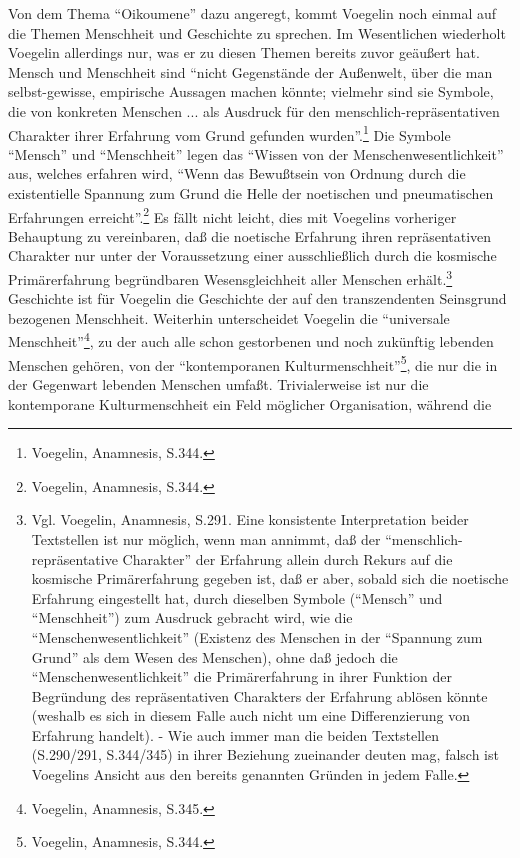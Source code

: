 Von dem Thema "`Oikoumene"' dazu angeregt, kommt Voegelin noch einmal auf die
Themen Menschheit und Geschichte zu sprechen. Im Wesentlichen wiederholt Voegelin
allerdings nur, was er zu diesen Themen bereits zuvor geäußert hat. Mensch und
Menschheit sind "`nicht Gegenstände der Außenwelt, über die man
selbst-gewisse, empirische Aussagen machen könnte; vielmehr sind sie Symbole,
die von konkreten Menschen ... als Ausdruck für den menschlich-repräsentativen
Charakter ihrer Erfahrung vom Grund gefunden wurden"'.\footnote{Voegelin,
  Anamnesis, S.344.} Die Symbole "`Mensch"' und "`Menschheit"' legen das
"`Wissen von der Menschenwesentlichkeit"' aus, welches erfahren wird, "`Wenn
das Bewußtsein von Ordnung durch die existentielle Spannung zum Grund die
Helle der noetischen und pneumatischen Erfahrungen
erreicht"'.\footnote{Voegelin, Anamnesis, S.344.} Es fällt nicht leicht, dies
mit Voegelins vorheriger Behauptung zu vereinbaren, daß die noetische
Erfahrung ihren repräsentativen Charakter nur unter der Voraussetzung einer
ausschließlich durch die kosmische Primärerfahrung begründbaren
Wesensgleichheit aller Menschen erhält.\footnote{Vgl. Voegelin, Anamnesis,
  S.291. Eine konsistente Interpretation beider Textstellen ist nur möglich,
  wenn man annimmt, daß der "`menschlich-repräsentative Charakter"' der
  Erfahrung allein durch Rekurs auf die kosmische Primärerfahrung gegeben ist,
  daß er aber, sobald sich die noetische Erfahrung eingestellt hat, durch
  dieselben Symbole ("`Mensch"' und "`Menschheit"') zum Ausdruck gebracht
  wird, wie die "`Menschenwesentlichkeit"' (Existenz des Menschen in der
  "`Spannung zum Grund"' als dem Wesen des Menschen), ohne daß jedoch die
  "`Menschenwesentlichkeit"' die Primärerfahrung in ihrer Funktion der
  Begründung des repräsentativen Charakters der Erfahrung ablösen könnte
  (weshalb es sich in diesem Falle auch nicht um eine Differenzierung von
  Erfahrung handelt). - Wie auch immer man die beiden Textstellen (S.290/291,
  S.344/345) in ihrer Beziehung zueinander deuten mag, falsch ist Voegelins
  Ansicht aus den bereits genannten Gründen in jedem Falle.} Geschichte ist
für Voegelin die Geschichte der auf den transzendenten Seinsgrund bezogenen
Menschheit. Weiterhin unterscheidet Voegelin die "`universale
Menschheit"'\footnote{Voegelin, Anamnesis, S.345.}, zu der auch alle schon
gestorbenen und noch zukünftig lebenden Menschen gehören, von der
"`kontemporanen Kulturmenschheit"'\footnote{Voegelin, Anamnesis, S.344.}, die
nur die in der Gegenwart lebenden Menschen umfaßt. Trivialerweise ist nur die
kontemporane Kulturmenschheit ein Feld möglicher Organisation, während die
